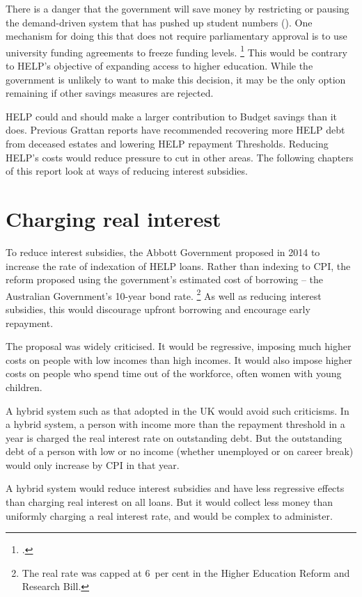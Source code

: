 \documentclass{grattan}
\begin{document}
There is a danger that the government will save money by restricting or pausing the demand-driven system that has pushed up student numbers ().
One mechanism for doing this that does not require parliamentary approval is to use university funding agreements to freeze funding levels.%
\footcite[][Chapter~7]{Norton2013Keepcapsoff} 
This would be contrary to \gls{HELP}'s objective of expanding access to higher education.
While the government is unlikely to want to make this decision, it may be the only option remaining if other savings measures are rejected.

\gls{HELP} could and should make a larger contribution to Budget savings than it does.
Previous Grattan reports have recommended recovering more \gls{HELP} debt from deceased estates and lowering \gls{HELP} repayment \gls{Threshold}s.
Reducing \gls{HELP}'s costs would reduce pressure to cut in other areas.
The following chapters of this report look at ways of reducing interest subsidies.

\chapter{Charging real interest}\label{chap:5-charging-real-interest}

To reduce interest subsidies, the Abbott Government proposed in 2014 to increase the rate of indexation of \gls{HELP} loans.
Rather than indexing to \gls{CPI}, the reform proposed using the government's estimated cost of borrowing -- the Australian Government's 10-year bond rate.%
   \footnote{The real rate was capped at 6~per cent in the Higher Education Reform and Research Bill.} 
As well as reducing interest subsidies, this would discourage upfront borrowing and encourage early repayment.

The proposal was widely criticised.
It would be regressive, imposing much higher costs on people with low incomes than high incomes.
It would also impose higher costs on people who spend time out of the workforce, often women with young children.

A hybrid system such as that adopted in the UK would avoid such criticisms. 
In a hybrid system, a person with income more than the repayment threshold in a year is charged the real interest rate on outstanding debt.
But the outstanding debt of a person with low or no income (whether unemployed or on career break) would only increase by \gls{CPI} in that year.

A hybrid system would reduce interest subsidies and have less regressive effects than charging real interest on all loans.
But it would collect less money than uniformly charging a real interest rate, and would be complex to administer.
\end{document}
